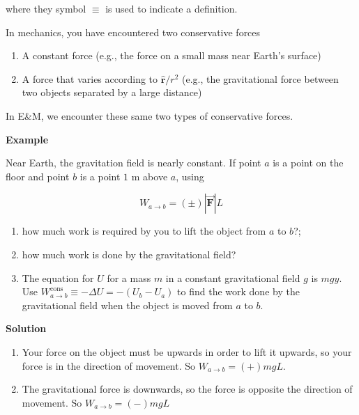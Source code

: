 \documentclass{article}
\newcommand{\rhat}[0]{\hat{\mathbf{r}}}
\newcommand{\bfvec}[1]{\vec{\mathbf{#1}}}
\begin{document}
where they symbol $\equiv$ is used to indicate a definition.

In mechanics, you have encountered two conservative forces

\begin{enumerate}

  \item A constant force (e.g., the force on a small mass near Earth's surface)

  \item A force that varies according to $\rhat/r^2$ (e.g., the gravitational force between two objects separated by a large distance)

\end{enumerate}

In E&M, we encounter these same two types of conservative forces.

\textbf{Example}

Near Earth, the gravitation field is nearly constant. If point $a$ is a point on the floor and point $b$ is a point $1\text{ m}$ above $a$, using

\begin{equation}
W_{a\rightarrow b}=(\pm)|\bfvec{F}|L
\end{equation}

\begin{enumerate}

  \item how much work is required by you to lift the object from $a$ to $b$?;

  \item how much work is done by the gravitational field?

  \item The equation for $U$ for a mass $m$ in a constant gravitational field $g $ is $mgy$. Use $W_{a\rightarrow b}^{\text{cons}} \equiv -\Delta U = -(U_b-U_a)$ to find the work done by the gravitational field when the object is moved from $a$ to $b$.

\end{enumerate}

\textbf{Solution}

\begin{enumerate}

  \item Your force on the object must be upwards in order to lift it upwards, so your force is in the direction of movement. So $W_{a\rightarrow b}=(+)mgL$.

  \item The gravitational force is downwards, so the force is opposite the direction of movement. So $W_{a\rightarrow b}=(-)mgL$

\end{enumerate}
\end{document}
